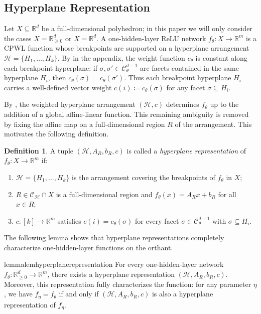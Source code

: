 \documentclass{article}
\theoremstyle{definition}
\newtheorem{definition}[theorem]{Definition}
\newcommand{\R}{\mathbb{R}}
\newcommand{\complex}{\mathcal{C}}
\newcommand{\orthant}[1]{\R_{\geq 0}^{#1}}
\begin{document}
\subsection{Hyperplane Representation}
Let $X \subseteq \R^d$ be a full-dimensional polyhedron; in this paper we will only consider the cases
$X=\orthant{d}$ or $X=\R^d$.
A one-hidden-layer ReLU network $f_\theta \colon X \to \R^m$ is a CPWL function whose breakpoints are supported on a hyperplane arrangement
$
\mathcal{H}=\{H_1,\dots,H_k\}.
$
By  in the appendix, the weight function $c_\theta$ is constant along each breakpoint hyperplane: if
$\sigma,\sigma' \in \complex_\theta^{d-1}$ are facets contained in the same hyperplane $H_i$, then
$
c_\theta(\sigma)=c_\theta(\sigma').
$
Thus each breakpoint hyperplane $H_i$ carries a well-defined vector weight
$
c(i)\coloneqq c_\theta(\sigma)
$ for any facet $\sigma\subseteq H_i.
$

By , the 
weighted hyperplane arrangement $(\mathcal{H},c)$ determines $f_\theta$ up to the addition of a global affine-linear function.
This remaining ambiguity is removed by fixing the affine map on a full-dimensional region $R$ of the arrangement.
This motivates the following definition. 

\begin{definition}
\label{def:hyperplane-representation}
A tuple $(\mathcal{H},A_R,b_R,c)$ is called a \emph{hyperplane representation} of
$f_\theta \colon X \to \R^m$ if:
\begin{enumerate}[leftmargin=*]
    \item $\mathcal{H}=\{H_1,\dots,H_k\}$ is the arrangement covering the breakpoints of $f_\theta$ in $X$;
    \item $R \in \complex_{\mathcal H}\cap X$ is a full-dimensional region and
    $
    f_\theta(x)=A_Rx+b_R$ for all $ x\in R;
    $
    \item $c\colon [k]\to \R^m$ satisfies
    $
    c(i)=c_\theta(\sigma)
   $ for every facet  $\sigma \in \complex_\theta^{d-1} \text{ with } \sigma\subseteq H_i.
    $
\end{enumerate}
\end{definition}

The following lemma shows that hyperplane representations completely characterize one-hidden-layer functions on the orthant.

\begin{restatable}{lemma}{lemhyperplanerepresentation}
\label{lem:hyperplane_representation}
    For every one-hidden-layer network $f_\theta \colon \orthant{d} \to \R^m$, there exists a hyperplane representation $(\mathcal{H}, A_R, b_R, c)$. 
    Moreover, this representation fully characterizes the function: 
    for any parameter $\eta$, we have $f_\eta = f_\theta$ if and only if $(\mathcal{H}, A_R, b_R, c)$ is also a hyperplane representation of $f_\eta$. 
\end{restatable} 
\end{document}
